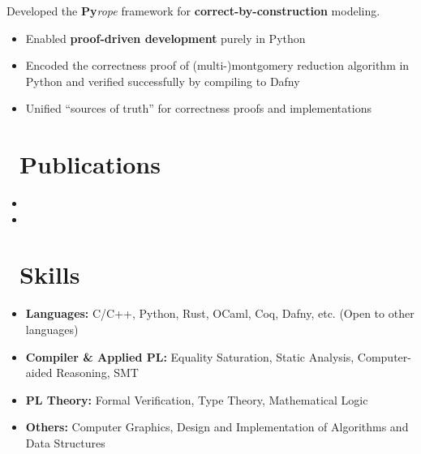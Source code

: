 \documentclass{resume}
\begin{document}
Developed the \textbf{Py}\textit{rope} framework for \textbf{correct-by-construction} modeling.
\begin{itemize}
  \item Enabled \textbf{proof-driven development} purely in Python
  \item Encoded the correctness proof of (multi-)montgomery reduction algorithm in Python and verified successfully by compiling to Dafny
  \item Unified ``sources of truth'' for correctness proofs and implementations
\end{itemize}

\section{\faLeanpub\ Publications}
\begin{itemize}
    \item {}
    \item {}
\end{itemize}

\section{\faCog\ Skills}
\begin{itemize}
    \item \textbf{Languages:} C/C++, Python, Rust, OCaml, Coq, Dafny, etc. (Open to other languages)
    \item \textbf{Compiler \& Applied PL:} Equality Saturation, Static Analysis, Computer-aided Reasoning, SMT
    \item \textbf{PL Theory:} Formal Verification, Type Theory, Mathematical Logic
    \item \textbf{Others:} Computer Graphics, Design and Implementation of Algorithms and Data Structures
\end{itemize}

\end{document}
